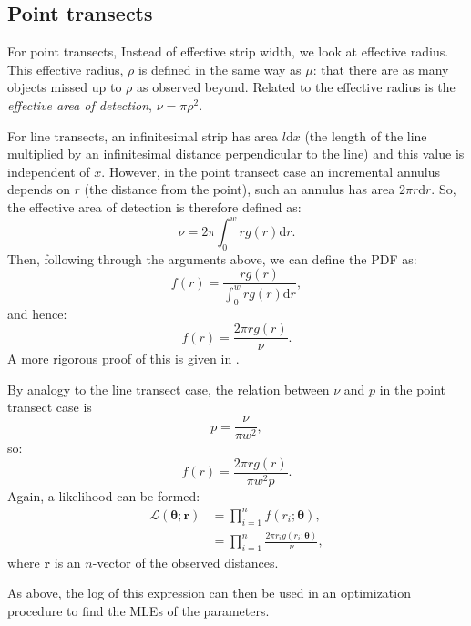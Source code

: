 \subsection{Point transects} 

For point transects, Instead of effective strip width, we look at effective radius. This effective radius, $\rho$ is defined in the same way as $\mu$: that there are as many objects missed up to $\rho$ as observed beyond. Related to the effective radius is the \textit{effective area of detection}, $\nu=\pi \rho^2$.

For line transects, an infinitesimal strip has area $l\text{d}x$ (the length of the line multiplied by an infinitesimal distance perpendicular to the line) and this value is independent of $x$. However, in the point transect case an incremental annulus depends on $r$ (the distance from the point), such an annulus has area $2\pi r \text{d}r$. So, the effective area of detection is therefore defined as:
\begin{equation*}
\nu = 2 \pi \int_0^w r g(r) \text{d}r.
\end{equation*}
Then, following through the arguments above, we can define the PDF as:
\begin{equation*}
f(r) = \frac{r g(r)}{\int_0^w r g(r) \text{d}r},
\end{equation*}
and hence: 
\begin{equation*}
f(r) = \frac{2 \pi r g(r)}{\nu}.
\end{equation*}
A more rigorous proof of this is given in .

By analogy to the line transect case, the relation between $\nu$ and $p$ in the point transect case is
\begin{equation*}
p=\frac{\nu}{\pi w^2},
\end{equation*}
so:
\begin{equation*}
f(r) = \frac{2 \pi r g(r)}{\pi w^2 p}.
\end{equation*}
Again, a likelihood can be formed:
\begin{align*}
\mathcal{L}(\bm{\theta}; \bm{r}) &= \prod_{i=1}^n f(r_i;\bm{\theta}),\\
&= \prod_{i=1}^n \frac{2 \pi r_i g(r_i;\bm{\theta})}{\nu},
\end{align*}
where $\bm{r}$ is an $n$-vector of the observed distances. 

As above, the log of this expression can then be used in an optimization procedure to find the MLEs of the parameters.

